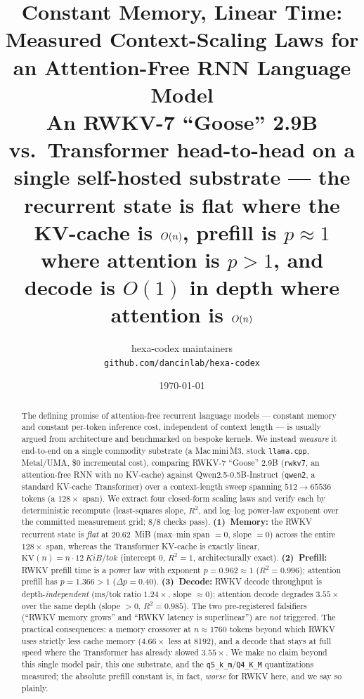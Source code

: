 \documentclass[11pt,a4paper]{article}
\title{
  \textbf{Constant Memory, Linear Time: Measured Context-Scaling Laws
  for an Attention-Free RNN Language Model}\\[4pt]
  \large An RWKV-7 ``Goose'' 2.9B vs.\ Transformer head-to-head on a single
  self-hosted substrate --- the recurrent state is flat where the KV-cache is
  \(O(\ctx)\), prefill is \(p\!\approx\!1\) where attention is \(p\!>\!1\),
  and decode is \(O(1)\) in depth where attention is \(O(\ctx)\)
}
\author{hexa-codex maintainers \\ \texttt{github.com/dancinlab/hexa-codex}}
\date{\today}
\newcommand{\ctx}{\ensuremath{n}}
\begin{document}
\maketitle

\begin{abstract}
The defining promise of attention-free recurrent language models --- constant
memory and constant per-token inference cost, independent of context length --- is
usually argued from architecture and benchmarked on bespoke kernels. We instead
\emph{measure} it end-to-end on a single commodity substrate (a Mac\,mini\,M3,
stock \texttt{llama.cpp}, Metal/UMA, \$0 incremental cost), comparing RWKV-7
``Goose'' 2.9B (\texttt{rwkv7}, an attention-free RNN with no KV-cache) against
Qwen2.5-0.5B-Instruct (\texttt{qwen2}, a standard KV-cache Transformer) over a
context-length sweep spanning \(512 \to \num{65536}\) tokens (a \(128\times\)
span). We extract four closed-form scaling laws and verify each by deterministic
recompute (least-squares slope, \(R^2\), and log--log power-law exponent over the
committed measurement grid; \(8/8\) checks pass).
\textbf{(1)~Memory:} the RWKV recurrent state is \emph{flat} at
\SI{20.62}{MiB} (max--min span \(=0\), slope \(=0\)) across the entire
\(128\times\) span, whereas the Transformer KV-cache is exactly linear,
\(\mathrm{KV}(\ctx)=\ctx\cdot\SI{12}{KiB/tok}\) (intercept \(0\), \(R^2=1\),
architecturally exact). \textbf{(2)~Prefill:} RWKV prefill time is a power law
with exponent \(p=0.962\approx 1\) (\(R^2=0.996\)); attention prefill has
\(p=1.366>1\) (\(\Delta p = 0.40\)). \textbf{(3)~Decode:} RWKV decode throughput
is depth-\emph{independent} (ms/tok ratio \(1.24\times\), slope \(\approx 0\));
attention decode degrades \(3.55\times\) over the same depth (slope
\(>0\), \(R^2=0.985\)). The two pre-registered falsifiers (``RWKV memory grows''
and ``RWKV latency is superlinear'') are \emph{not} triggered. The practical
consequences: a memory crossover at \(\ctx\approx\num{1760}\) tokens beyond which
RWKV uses strictly less cache memory (\(4.66\times\) less at \num{8192}), and a
decode that stays at full speed where the Transformer has already slowed
\(3.55\times\). We make no claim beyond this single model pair, this one
substrate, and the \texttt{q5\_k\_m}/\texttt{Q4\_K\_M} quantizations measured;
the absolute prefill constant is, in fact, \emph{worse} for RWKV here, and we
say so plainly.
\end{abstract}

\end{document}
